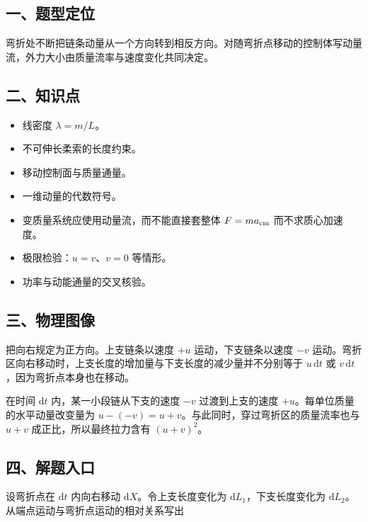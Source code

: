 \documentclass[12pt,a4paper,UTF8]{ctexart}
\newcommand{\tightlist}{\setlength{\itemsep}{0pt}\setlength{\parskip}{0pt}}
\begin{document}
\subsection{一、题型定位}\label{ux4e00ux9898ux578bux5b9aux4f4d-1}

弯折处不断把链条动量从一个方向转到相反方向。对随弯折点移动的控制体写动量流，外力大小由质量流率与速度变化共同决定。

\subsection{二、知识点}\label{ux4e8cux77e5ux8bc6ux70b9-1}

\begin{itemize}
\tightlist
\item
  线密度 \(\lambda=m/L\)。
\item
  不可伸长柔索的长度约束。
\item
  移动控制面与质量通量。
\item
  一维动量的代数符号。
\item
  变质量系统应使用动量流，而不能直接套整体 \(F=ma_{\rm cm}\)
  而不求质心加速度。
\item
  极限检验：\(u=v\)、\(v=0\) 等情形。
\item
  功率与动能通量的交叉核验。
\end{itemize}

\subsection{三、物理图像}\label{ux4e09ux7269ux7406ux56feux50cf-1}

把向右规定为正方向。上支链条以速度 \(+u\) 运动，下支链条以速度 \(-v\)
运动。弯折区向右移动时，上支长度的增加量与下支长度的减少量并不分别等于
\(u\,\mathrm{d}t\) 或 \(v\,\mathrm{d}t\)，因为弯折点本身也在移动。

在时间 \(\mathrm{d}t\) 内，某一小段链从下支的速度 \(-v\)
过渡到上支的速度 \(+u\)。每单位质量的水平动量改变量为
\(u-(-v)=u+v\)。与此同时，穿过弯折区的质量流率也与 \(u+v\)
成正比，所以最终拉力含有 \((u+v)^2\)。

\subsection{四、解题入口}\label{ux56dbux89e3ux9898ux5165ux53e3-1}

设弯折点在 \(\mathrm{d}t\) 内向右移动 \(\mathrm{d}X\)。令上支长度变化为
\(\mathrm{d}L_1\)，下支长度变化为
\(\mathrm{d}L_2\)。从端点运动与弯折点运动的相对关系写出
\end{document}
